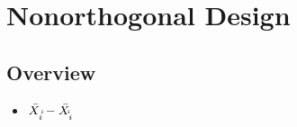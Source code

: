 \documentclass[11pt,fleqn]{book} %
\begin{document}







\chapter{Nonorthogonal Design}

\section{Overview}

\begin{itemize}
	\item $\bar{X_{i\dot\dot}} - \bar{X_{\dot\dot i}}$
\end{itemize}


\end{document}
